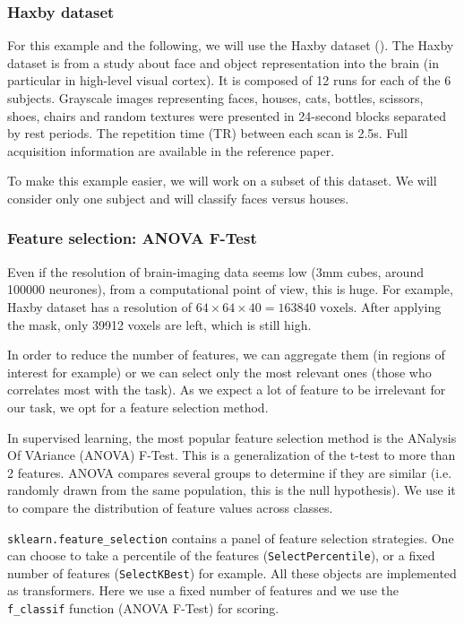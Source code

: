 \documentclass{frontiersSCNS} %
\begin{document}
\subsubsection{Haxby dataset}

For this example and the following, we will use the Haxby dataset
(\cite{haxby2001}).
The Haxby dataset is from a study about face and object representation into the
brain (in particular in high-level visual cortex). It is composed of 12 runs for
each of the 6 subjects. Grayscale images representing faces, houses, cats,
bottles, scissors, shoes, chairs and random textures were presented in
24-second blocks separated by rest periods. The repetition time (TR) between each
scan is 2.5s. Full acquisition information are available in the reference paper.

To make this example easier, we will work on a subset of this dataset. We will
consider only one subject and will classify faces versus houses.

\subsubsection{Feature selection: ANOVA F-Test}

Even if the resolution of brain-imaging data seems low (3mm cubes, around 100000
neurones), from a computational point of view, this is huge. For example,
Haxby dataset has a resolution of $64\times64\times40 = 163840\text{ voxels}$.
After applying the mask, only 39912 voxels are left, which is still high.

In order to reduce the number of features, we can aggregate them (in regions of
interest for example) or we can select only the most relevant ones (those who
correlates most with the task). As we expect a lot of feature to be irrelevant
for our task, we opt for a feature selection method.

In supervised learning, the most popular feature selection method is the
ANalysis Of VAriance (ANOVA) F-Test. This is a generalization of the t-test to
more than 2 features. ANOVA compares several
groups to determine if they are similar (i.e. randomly drawn from the same
population, this is the null hypothesis). We use it to compare the distribution
of feature values across classes.

\verb!sklearn.feature_selection! contains a panel of feature selection
strategies. One can choose to take a percentile of the features
(\verb!SelectPercentile!), or a fixed number of features (\verb!SelectKBest!)
for example. All these objects are implemented as transformers.
Here we use a fixed number of features and we use the \verb!f_classif! function
(ANOVA F-Test) for scoring.
\end{document}
